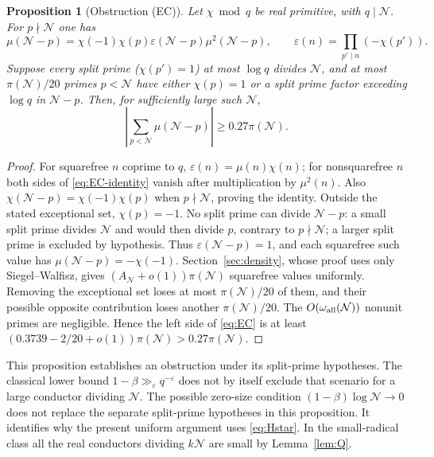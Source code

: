 \documentclass[11pt]{article}
\newtheorem{proposition}[theorem]{Proposition}
\theoremstyle{definition}
\newcommand{\GN}{\mathcal N}
\theoremstyle{remark}
\numberwithin{equation}{section}
\begin{document}
\begin{proposition}[Obstruction (EC)]\label{prop:EC}
Let $\chi\bmod q$ be real primitive, with $q\mid\GN$.
For $p\nmid\GN$ one has
\begin{equation}\label{eq:EC-identity}
 \mu(\GN-p)=\chi(-1)\chi(p)\varepsilon(\GN-p)\mu^2(\GN-p),
 \qquad \varepsilon(n)=\prod_{p'\mid n}(-\chi(p')).
\end{equation}
Suppose every split prime ($\chi(p')=1$) at most $\log q$ divides
$\GN$, and at most $\pi(\GN)/20$ primes $p<\GN$ have either
$\chi(p)=1$ or a split prime factor exceeding $\log q$ in $\GN-p$.
Then, for sufficiently large such $\GN$,
\begin{equation}\label{eq:EC}
 \left|\sum_{p<\GN}\mu(\GN-p)\right|\ge0.27\pi(\GN).
\end{equation}
\end{proposition}
\begin{proof}
For squarefree $n$ coprime to $q$,
$\varepsilon(n)=\mu(n)\chi(n)$; for nonsquarefree $n$ both sides of
\eqref{eq:EC-identity} vanish after multiplication by $\mu^2(n)$.
Also $\chi(\GN-p)=\chi(-1)\chi(p)$ when $p\nmid\GN$,
proving the identity.
Outside the stated exceptional set, $\chi(p)=-1$.
No split prime can divide $\GN-p$: a small split prime divides
$\GN$ and would then divide $p$, contrary to $p\nmid\GN$;
a larger split prime is excluded by hypothesis.
Thus $\varepsilon(\GN-p)=1$, and each squarefree such value has
$\mu(\GN-p)=-\chi(-1)$.
Section~\ref{sec:density}, whose proof uses only Siegel--Walfisz,
gives $(A_{\GN}+o(1))\pi(\GN)$ squarefree values uniformly.
Removing the exceptional set loses at most $\pi(\GN)/20$ of them,
and their possible opposite contribution loses another
$\pi(\GN)/20$. The $O(\omega_{\rm all}(\GN))$ nonunit primes are
negligible. Hence the left side of \eqref{eq:EC} is at least
$(0.3739-2/20+o(1))\pi(\GN)>0.27\pi(\GN)$.
\end{proof}
This proposition establishes an obstruction under its split-prime
hypotheses. The classical lower bound
$1-\beta\gg_\varepsilon q^{-\varepsilon}$ does not by itself
exclude that scenario for a large conductor dividing $\GN$.
The possible zero-size condition $(1-\beta)\log\GN\to0$
does not replace the separate split-prime hypotheses in this proposition.
It identifies why the present uniform argument uses
\eqref{eq:Hstar}. In the small-radical class all the real
conductors dividing $k\GN$ are small by Lemma~\ref{lem:Q}.
\end{document}
